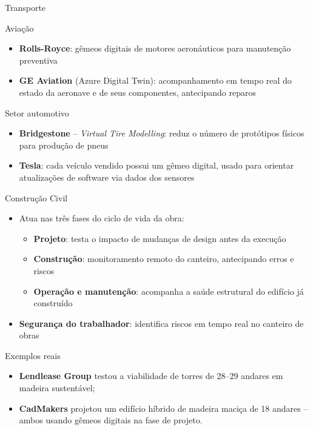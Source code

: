 \documentclass[aspectratio=169,xcolor=dvipsnames]{beamer}
\begin{document}
\begin{frame}{Transporte}
    \begin{exampleblock}{Aviação}
        \begin{itemize}
            \item \textbf{Rolls-Royce}: gêmeos digitais de motores aeronáuticos para manutenção preventiva
            \item \textbf{GE Aviation} (Azure Digital Twin): acompanhamento em tempo real do estado da aeronave e de seus componentes, antecipando reparos
        \end{itemize}
    \end{exampleblock}
    \begin{exampleblock}{Setor automotivo}
        \begin{itemize}
            \item \textbf{Bridgestone} -- \textit{Virtual Tire Modelling}: reduz o número de protótipos físicos para produção de pneus
            \item \textbf{Tesla}: cada veículo vendido possui um gêmeo digital, usado para orientar atualizações de software via dados dos sensores
        \end{itemize}
    \end{exampleblock}
\end{frame}

\begin{frame}{Construção Civil}
    \begin{itemize}
        \item Atua nas três fases do ciclo de vida da obra:
        \begin{itemize}
            \item \textbf{Projeto}: testa o impacto de mudanças de design antes da execução
            \item \textbf{Construção}: monitoramento remoto do canteiro, antecipando erros e riscos
            \item \textbf{Operação e manutenção}: acompanha a saúde estrutural do edifício já construído
        \end{itemize}
        \item \textbf{Segurança do trabalhador}: identifica riscos em tempo real no canteiro de obras
    \end{itemize}
    \begin{exampleblock}{Exemplos reais}
        \begin{itemize}
        \item \textbf{Lendlease Group} testou a viabilidade de torres de 28--29 andares em madeira sustentável; 
        \item \textbf{CadMakers} projetou um edifício híbrido de madeira maciça de 18 andares -- ambos usando gêmeos digitais na fase de projeto.
        \end{itemize}
    \end{exampleblock}
\end{frame}
\end{document}
